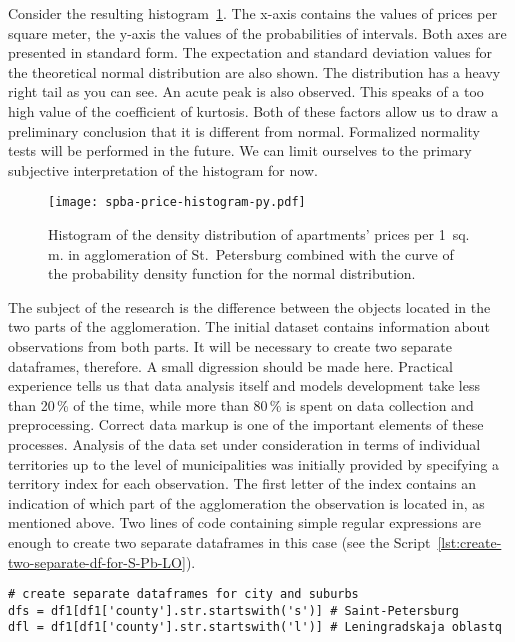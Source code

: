 \documentclass[]{scrreprt}
\begin{document}
Consider the resulting histogram~\ref{fig:spba-prices-hist}. The x-axis contains the values of prices per square meter, the y-axis the values of the probabilities of intervals. Both axes are presented in standard form. The expectation and standard deviation values for the theoretical normal distribution are also shown. The distribution has a heavy right tail as you can see. An acute peak is also observed. This speaks of a too high value of the coefficient of kurtosis. Both of these factors allow us to draw a preliminary conclusion that it is different from normal. Formalized normality tests will be performed in the future. We can limit ourselves to the primary subjective interpretation of the histogram for now.
%
\begin{figure}[htp]
	\centering
	\texttt{[image: spba-price-histogram-py.pdf]}
	\caption{Histogram of the density distribution of apartments' prices per 1~sq.\,m. in agglomeration of  St.~Petersburg combined with the curve of the probability density function for the normal distribution.}
	\label{fig:spba-prices-hist}
\end{figure}
%
The subject of the research is the difference between the objects located in the two parts of the agglomeration. The initial dataset contains information about observations from both parts. It will be necessary to create two separate dataframes, therefore. A small digression should be made here. Practical experience tells us that data analysis itself and models development take less than 20\,\% of the time, while more than 80\,\% is spent on data collection and preprocessing. Correct data markup is one of the important elements of these processes. Analysis of the data set under consideration in terms of individual territories up to the level of municipalities was initially provided by specifying a territory index for each observation. The first letter of the index contains an indication of which part of the agglomeration the observation is located in, as mentioned above. Two lines of code containing simple regular expressions are enough to create two separate dataframes in this case (see the Script~\ref{lst:create-two-separate-df-for-S-Pb-LO}).
%
\begin{lstlisting}[float=htp, caption = Creating separate dataframes for St.~Petersburg and the Leningrad Region., firstnumber=1, label= lst:create-two-separate-df-for-S-Pb-LO]
# create separate dataframes for city and suburbs
dfs = df1[df1['county'].str.startswith('s')] # Saint-Petersburg
dfl = df1[df1['county'].str.startswith('l')] # Leningradskaja oblastq
\end{lstlisting}
\end{document}
